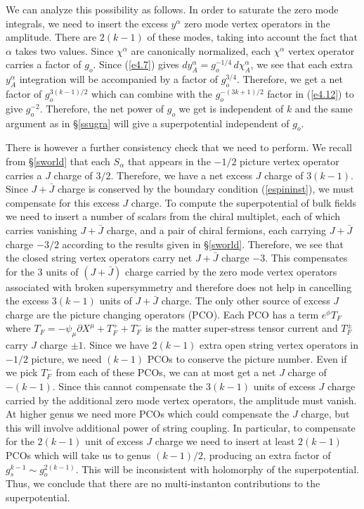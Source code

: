 \documentclass[12pt,a4paper]{article}
\newcommand{\refb}[1]{(\ref{#1})}
\newcommand{\p}{\partial}
\def\bJ{\bar J}
\begin{document}
We can analyze this possibility as follows. In order to saturate the zero mode integrals, we need
to insert the excess $y^\alpha$ zero mode vertex operators in the amplitude. There are
$2(k-1)$ of these modes, taking into account the fact that $\alpha$ takes two values. Since $\chi^\alpha$
are canonically normalized, each $\chi^\alpha$ vertex operator
carries a factor of $g_o$. Since \refb{e4.7} gives $dy_A^\alpha = g_o^{-1/4} \, d\chi_A^\alpha$,
we see that each extra $y^\alpha_A$ integration will be accompanied by a factor of
$g_o^{3/4}$. Therefore, we get a net factor of $g_o^{3(k-1)/2}$ which can combine with the
$g_o^{-(3k+1)/2}$ factor in \refb{e4.12} to give $g_o^{-2}$. Therefore, the net power of $g_o$
we get is independent of $k$ and the same argument as in \S\ref{ssugra} will give a superpotential
independent of $g_o$.

There is however a further consistency check that we need to perform. We recall from \S\ref{sworld} that each
$S_\alpha$ that appears in the $-1/2$ picture vertex operator carries a $J$ charge of $3/2$.
Therefore, we have a net excess $J$ charge of $3(k-1)$. Since $J+\bar J$ charge is conserved
by the boundary condition \refb{espininst}, we must compensate for this excess $J$ charge.
To compute the superpotential of bulk fields we need to insert a number of scalars
from the chiral multiplet, each of which carries vanishing $J+\bJ$ charge, and a pair of
chiral fermions, each carrying $J+\bJ$ charge $-3/2$ according to the results given in
\S\ref{sworld}. Therefore, we see that the closed string vertex operators carry net $J+\bJ$ charge $-3$.
This compensates for the 3 units of $(J+\bJ)$ charge carried by the zero mode vertex
operators associated with broken supersymmetry and therefore does not help in cancelling the
excess $3(k-1)$ units of $J+\bJ$ charge. The only other
source of excess $J$ charge are the picture changing operators (PCO). Each PCO has a term
$e^\phi T_F$ where $T_F=-\psi_\mu \p X^\mu+
T_F^++T_F^-$ is the matter super-stress tensor current and $T_F^\pm$
carry $J$ charge $\pm 1$. Since we have $2(k-1)$ extra open string vertex operators in $-1/2$
picture, we need $(k-1)$ PCOs to conserve the picture number. Even if we pick $T_F^-$ from
each of these PCOs, we can at most get a net $J$ charge of $-(k-1)$. Since this cannot
compensate the $3(k-1)$ units of excess
$J$ charge carried by the additional zero mode vertex operators, the amplitude
must vanish. At higher genus we need more PCOs which could compensate the $J$ charge,
but this will involve additional power of string coupling. In particular, to compensate for the
$2(k-1)$ unit of excess $J$ charge we need to insert at least $2(k-1)$ PCOs which will take us
to genus $(k-1)/2$, producing an extra factor of $g_s^{k-1}\sim g_o^{2(k-1)}$. This
will be inconsistent with holomorphy of the superpotential.
Thus, we conclude that there are no multi-instanton contributions to the superpotential.
\end{document}

